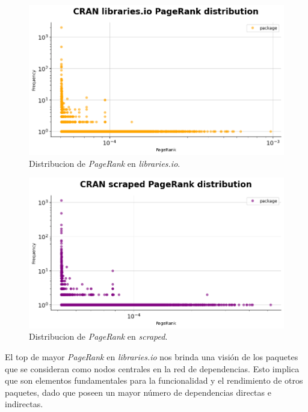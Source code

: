 \begin{figure}[h!]
    \begin{center}
        \includegraphics[width=1\textwidth]{img/cran/pr.png}
        \caption{Distribucion de \textit{PageRank} en \textit{libraries.io}.}
        \label{fig:cran_pr_libio}
    \end{center}
\end{figure}

\begin{figure}[h!]
    \begin{center}
        \includegraphics[width=1\textwidth]{img/cran/pr2.png}
        \caption{Distribucion de \textit{PageRank} en \textit{scraped}.}
        \label{fig:cran_pr_scraped}
    \end{center}
\end{figure}

El top de mayor \textit{PageRank} en \textit{libraries.io} nos brinda una visión de los paquetes que se
consideran como nodos centrales en la red de dependencias. Esto implica que son elementos fundamentales
para la funcionalidad y el rendimiento de otros paquetes, dado que poseen un mayor número de dependencias
directas e indirectas.

